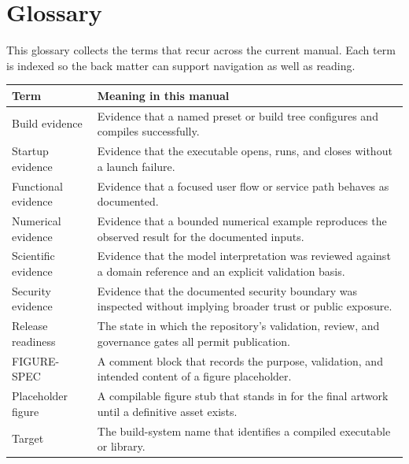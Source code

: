 \chapter{Glossary}
\label{chap:appendix-glossary}

This glossary collects the terms that recur across the current manual. Each
term is indexed so the back matter can support navigation as well as reading.

\begin{table}[htbp]
\centering
\small
\begin{tabular}{|p{3.6cm}|p{8.0cm}|}
\hline
\textbf{Term} & \textbf{Meaning in this manual} \\
\hline
Build evidence\index{build evidence} & Evidence that a named preset or build tree configures and compiles successfully. \\
\hline
Startup evidence\index{startup evidence} & Evidence that the executable opens, runs, and closes without a launch failure. \\
\hline
Functional evidence\index{functional evidence} & Evidence that a focused user flow or service path behaves as documented. \\
\hline
Numerical evidence\index{numerical evidence} & Evidence that a bounded numerical example reproduces the observed result for the documented inputs. \\
\hline
Scientific evidence\index{scientific evidence} & Evidence that the model interpretation was reviewed against a domain reference and an explicit validation basis. \\
\hline
Security evidence\index{security evidence} & Evidence that the documented security boundary was inspected without implying broader trust or public exposure. \\
\hline
Release readiness\index{release readiness} & The state in which the repository's validation, review, and governance gates all permit publication. \\
\hline
FIGURE-SPEC\index{FIGURE-SPEC} & A comment block that records the purpose, validation, and intended content of a figure placeholder. \\
\hline
Placeholder figure\index{figure!placeholder} & A compilable figure stub that stands in for the final artwork until a definitive asset exists. \\
\hline
Target\index{target} & The build-system name that identifies a compiled executable or library. \\
\hline

\end{tabular}
\end{table}
